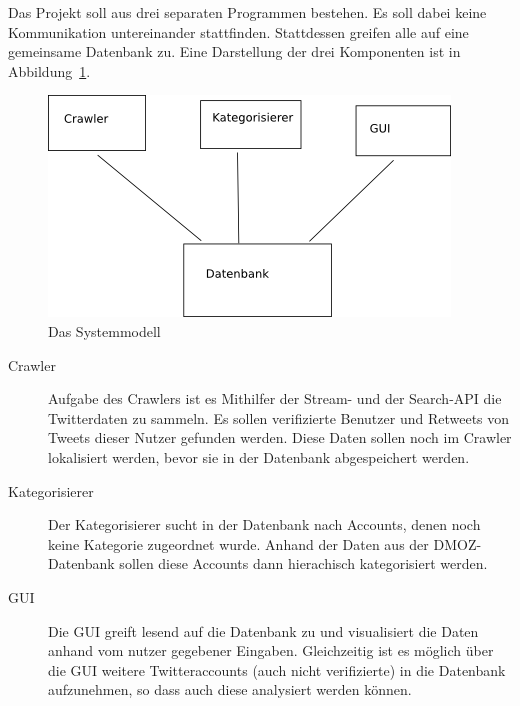 
Das Projekt soll aus drei separaten Programmen bestehen. Es soll dabei keine Kommunikation untereinander stattfinden. Stattdessen greifen alle auf eine gemeinsame Datenbank zu. Eine Darstellung der drei Komponenten ist in Abbildung~\ref{c:systemmodell}.

\begin{figure}[h]
	\centering
	\includegraphics{img/systemmodell.png}
	\caption{Das Systemmodell}
	\label{c:systemmodell}
\end{figure}

\begin{description}
	\item[Crawler] Aufgabe des Crawlers ist es Mithilfer der Stream- und der Search-API die Twitterdaten zu sammeln. Es sollen verifizierte Benutzer und Retweets von Tweets dieser Nutzer gefunden werden. Diese Daten sollen noch im Crawler lokalisiert werden, bevor sie in der Datenbank abgespeichert werden.
	\item[Kategorisierer] Der Kategorisierer sucht in der Datenbank nach Accounts, denen noch keine Kategorie zugeordnet wurde. Anhand der Daten aus der DMOZ-Datenbank sollen diese Accounts dann hierachisch kategorisiert werden.
	\item[GUI] Die GUI greift lesend auf die Datenbank zu und visualisiert die Daten anhand vom nutzer gegebener Eingaben. Gleichzeitig ist es möglich über die GUI weitere Twitteraccounts (auch nicht verifizierte) in die Datenbank aufzunehmen, so dass auch diese analysiert werden können.
\end{description}



